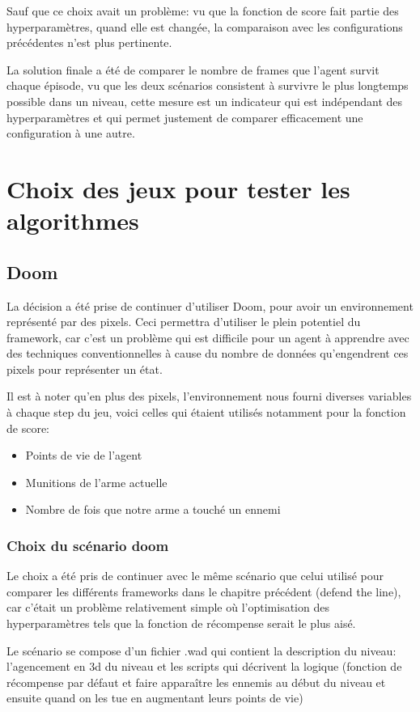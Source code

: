 \documentclass[a4paper,10pt,openany,oneside]{report}
\begin{document}
Sauf que ce choix avait un problème: vu que la fonction de score fait partie des hyperparamètres, quand elle est changée, la comparaison avec les configurations précédentes n'est plus pertinente.

La solution finale a été de comparer le nombre de frames que l'agent survit chaque épisode, vu que les deux scénarios consistent à survivre le plus longtemps possible dans un niveau, cette mesure est un indicateur qui est indépendant des hyperparamètres et qui permet justement de comparer efficacement une configuration à une autre.
\section{Choix des jeux pour tester les algorithmes}
\subsection{Doom}
La décision a été prise de continuer d'utiliser Doom, pour avoir un environnement représenté par des pixels. Ceci permettra d'utiliser le plein potentiel du framework, car c'est un problème qui est difficile pour un agent à apprendre avec des techniques conventionnelles à cause du nombre de données qu'engendrent ces pixels pour représenter un état.

Il est à noter qu'en plus des pixels, l'environnement nous fourni diverses variables à chaque step du jeu, voici celles qui étaient utilisés notamment pour la fonction de score:
\begin{itemize}
\item Points de vie de l'agent
\item Munitions de l'arme actuelle
\item Nombre de fois que notre arme a touché un ennemi
\end{itemize}
\subsubsection{Choix du scénario doom}
Le choix a été pris de continuer avec le même scénario que celui utilisé pour comparer les différents frameworks dans le chapitre précédent (defend the line), car c'était un problème relativement simple où l'optimisation des hyperparamètres tels que la fonction de récompense serait le plus aisé.

Le scénario se compose d'un fichier .wad qui contient la description du niveau: l'agencement en 3d du niveau et les scripts qui décrivent la logique (fonction de récompense par défaut et faire apparaître les ennemis au début du niveau et ensuite quand on les tue en augmentant leurs points de vie)
\end{document}
